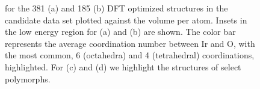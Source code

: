 \begin{figure}[!htb]
\centering
{}
\caption{\label{fig:E_vs_V}
\DHf for the \num{381} \IrOtwo (a) and \num{185} \IrOthree (b) DFT optimized structures in the candidate data set plotted against the volume per atom.
%
Insets in the low energy region for (a) and (b) are shown.
%
The color bar represents the average coordination number between Ir and O, with the most common, 6 (octahedra) and 4 (tetrahedral) coordinations, highlighted.
%
For \IrOtwo (c) and \IrOthree (d) we highlight the structures of select polymorphs.
}
\end{figure}



